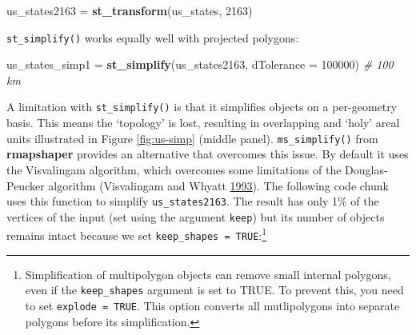 \documentclass[]{krantz}
\newenvironment{Shaded}{\begin{snugshade}}{\end{snugshade}}
\newcommand{\CommentTok}[1]{\textcolor[rgb]{0.37,0.37,0.37}{\textit{#1}}}
\newcommand{\DataTypeTok}[1]{\textcolor[rgb]{0.27,0.27,0.27}{#1}}
\newcommand{\DecValTok}[1]{\textcolor[rgb]{0.06,0.06,0.06}{#1}}
\newcommand{\FloatTok}[1]{\textcolor[rgb]{0.06,0.06,0.06}{#1}}
\newcommand{\KeywordTok}[1]{\textcolor[rgb]{0.27,0.27,0.27}{\textbf{#1}}}
\newcommand{\NormalTok}[1]{#1}
\newcommand{\OperatorTok}[1]{\textcolor[rgb]{0.43,0.43,0.43}{\textbf{#1}}}
\newcommand{\OtherTok}[1]{\textcolor[rgb]{0.37,0.37,0.37}{#1}}
\newcommand{\StringTok}[1]{\textcolor[rgb]{0.5,0.5,0.5}{#1}}
\let\rmarkdownfootnote\footnote%
\def\footnote{\protect\rmarkdownfootnote}
\begin{document}
\begin{Shaded}
\begin{Highlighting}[]
\NormalTok{us_states2163 =}\StringTok{ }\KeywordTok{st_transform}\NormalTok{(us_states, }\DecValTok{2163}\NormalTok{)}
\end{Highlighting}
\end{Shaded}

\texttt{st\_simplify()} works equally well with projected polygons:

\begin{Shaded}
\begin{Highlighting}[]
\NormalTok{us_states_simp1 =}\StringTok{ }\KeywordTok{st_simplify}\NormalTok{(us_states2163, }\DataTypeTok{dTolerance =} \DecValTok{100000}\NormalTok{)  }\CommentTok{# 100 km}
\end{Highlighting}
\end{Shaded}

A limitation with \texttt{st\_simplify()} is that it simplifies objects on a per-geometry basis.
This means the `topology' is lost, resulting in overlapping and `holy' areal units illustrated in Figure \ref{fig:us-simp} (middle panel).
\texttt{ms\_simplify()} from \textbf{rmapshaper} provides an alternative that overcomes this issue.
By default it uses the Visvalingam algorithm, which overcomes some limitations of the Douglas-Peucker algorithm (Visvalingam and Whyatt \protect\hyperlink{ref-visvalingam_line_1993}{1993}).
The following code chunk uses this function to simplify \texttt{us\_states2163}.
The result has only 1\% of the vertices of the input (set using the argument \texttt{keep}) but its number of objects remains intact because we set \texttt{keep\_shapes\ =\ TRUE}:\footnote{Simplification of multipolygon objects can remove small internal polygons, even if the \texttt{keep\_shapes} argument is set to TRUE. To prevent this, you need to set \texttt{explode\ =\ TRUE}. This option converts all mutlipolygons into separate polygons before its simplification.}

\begin{Shaded}
\end{Shaded}
\end{document}
